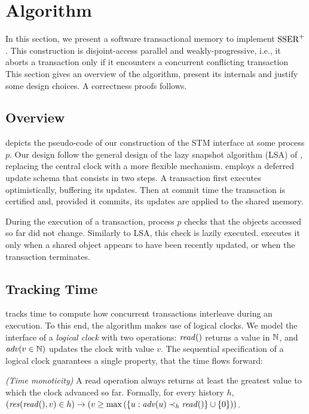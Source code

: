 \section{Algorithm}

In this section, we present a software transactional memory to implement $\SPSER$.
This construction is disjoint-access parallel and weakly-progressive, i.e., it aborts a transaction only if it encounters a concurrent conflicting transaction 
This section gives an overview of the algorithm, present its internals and justify some design choices.
A correctness proofs follows.

\subsection{Overview}

 depicts the pseudo-code of our construction of the STM interface at some process $p$.
Our design follow the general design of the lazy snapshot algorithm (LSA) of \citet{FelberFMR10}, replacing the central clock with a more flexible mechanism.
 employs a deferred update schema that consists in two steps.
A transaction first executes optimistically, buffering its updates.
Then at commit time the transaction is certified and, provided it commits, its updates are applied to the shared memory.

During the execution of a transaction, process $p$ checks that the objects accessed so far did not change.
Similarly to LSA, this check is lazily executed.
 executes it only when a shared object appears to have been recently updated, or when the transaction terminates.

\subsection{Tracking Time}

 tracks time to compute how concurrent transactions interleave during an execution.
To this end, the algorithm makes use of logical clocks.
We model the interface of a \emph{logical clock} with two operations: $\cread$ returns a value in $\naturalSet$, and $\cadv(v \in \naturalSet)$ updates the clock with value $v$.
The sequential specification of a logical clock guarantees a single property, that the time flows forward:
\begin{inparaenum}
\item[\emph{(Time monoticity)}]
  A read operation always returns at least the greatest value to which the clock advanced so far.
  Formally, for every history $h$, $(\responseAny{\cread}{v} \in h) \implies (v \geq \max{(\{u : \cadv(u) \hb_h \cread \} \union \{0\})})$.
\end{inparaenum}

